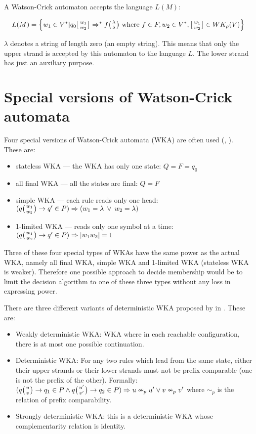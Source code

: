 A Watson-Crick automaton accepts the language $L(M)$:

$$L(M) = \Big\{w_1 \in V^* | q_0 \wkdomain{w_1}{w_2} \Rightarrow^* f \wkpair{\lambda}{\lambda} \textnormal{ where } f \in F, w_2 \in V^*, \wkdomain{w_1}{w_2} \in WK_{\rho}(V)\Big\}$$

$\lambda$ denotes a string of length zero (an empty string). This means that only the upper strand is accepted by this automaton to the language $L$. The lower strand has just an auxiliary purpose.

\section{Special versions of Watson-Crick automata}
Four special versions of Watson-Crick automata (WKA) are often used (\cite{DETERM_WKA}, \cite{STATE_COMPL}). These are:
\begin{itemize}
  \item{stateless WKA --- the WKA has only one state: $Q = F = {q_0}$}
  \item{all final WKA --- all the states are final: $Q = F$}
  \item{simple WKA --- each rule reads only one head: $(q \wkpair{w_1}{w_2} \rightarrow q' \in P) \Rightarrow (w_1 = \lambda \:\vee \:w_2 = \lambda)$}
  \item{1-limited WKA --- reads only one symbol at a time: $(q\wkpair{w_1}{w_2} \rightarrow q' \in P) \Rightarrow |w_1 w_2| = 1$}
\end{itemize}

Three of these four special types of WKAs have the same power as the actual WKA, namely all final WKA, simple WKA and 1-limited WKA (stateless WKA is weaker). Therefore one possible approach to decide membership would be to limit the decision algorithm to one of these three types without any loss in expressing power.

There are three different variants of deterministic WKA proposed by in \cite{DETERM_WKA}. These are:
\begin{itemize}
  \item{Weakly deterministic WKA: WKA where in each reachable configuration, there is at most one possible continuation.}
  \item{Deterministic WKA: For any two rules which lead from the same state, either their upper strands or their lower strands must not be prefix comparable (one is not the prefix of the other). Formally: $(q \wkpair{u}{v} \rightarrow q_1 \in P \wedge q \wkpair{u'}{v'} \rightarrow q_2 \in P) \Rightarrow u \nsim_p u' \vee v \nsim_p v'$ where $\sim_p$ is the relation of prefix comparability.}
  \item{Strongly deterministic WKA: this is a deterministic WKA whose complementarity relation is identity.}
\end{itemize}

